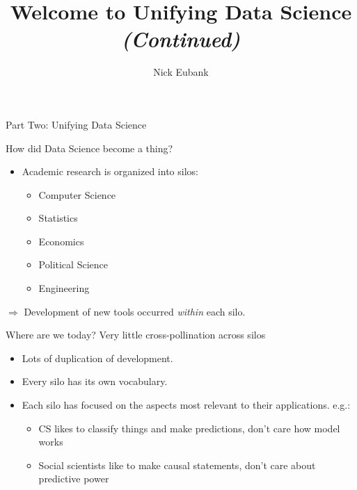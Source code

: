 \documentclass[11pt]{beamer}
\title{Welcome to Unifying Data Science \\ \emph{(Continued)} }
\author{\small Nick Eubank}
\date{\vspace*{.3in} \date}
\begin{document}
\begin{frame}[c]
\maketitle
\end{frame}


\begin{frame}[c]{}
    \centering 
    Part Two: Unifying Data Science
  \end{frame}
  
  \begin{frame}[c]{How did Data Science become a thing?}
  
  \begin{itemize}
      \pause \item Academic research is organized into silos:
      \pause
      \begin{itemize}
          \item Computer Science
          \item Statistics
          \item Economics
          \item Political Science
          \item Engineering
      \end{itemize}
  \end{itemize}
  \pause $\Rightarrow$ Development of new tools occurred \emph{within} each silo.
  \end{frame}
  
  
  \begin{frame}[c]{Where are we today?}
  Very little cross-pollination across silos
  \begin{itemize}
      \pause \item Lots of duplication of development.
      \pause \item Every silo has its own vocabulary.
      \pause \item Each silo has focused on the aspects most relevant to their applications. e.g.:
      \begin{itemize}
          \pause \item CS likes to classify things and make predictions, don't care how model works
          \item Social scientists like to make causal statements, don't care about predictive power
      \end{itemize}
  \end{itemize}
  \end{frame}
  
\end{document}
